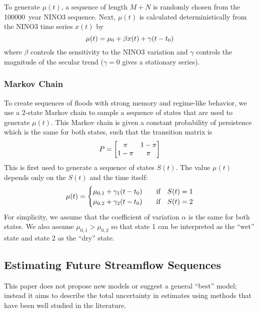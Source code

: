 \documentclass[12pt]{article}
\begin{document}
To generate $\mu(t)$, a sequence of length $M+N$ is randomly chosen from the \SI{100000}{year} NINO3 sequence.
Next, $\mu(t)$ is calculated deterministically from the NINO3 time series $x(t)$ by
\begin{equation}\label{eq:nino3}
  \mu(t) = \mu_0 + \beta x(t) + \gamma \qty(t - t_0)
\end{equation}
where $\beta$ controls the sensitivity to the NINO3 variation and $\gamma$ controls the magnitude of the secular trend ($\gamma=0$ gives a stationary series).

\subsubsection{Markov Chain\label{sec:methods-markov}}

To create sequences of floods with strong memory and regime-like behavior, we use a 2-state Markov chain to sample a sequence of states that are used to generate $\mu(t)$.
This Markov chain is given a constant probability of persistence which is the same for both states, such that the transition matrix is
\begin{equation*}
  P = \mqty[\pi & 1-\pi \\ 1-\pi & \pi]
\end{equation*}
This is first used to generate a sequence of states $S(t)$.
The value $\mu(t)$ depends only on the $S(t)$ and the time itself:
\begin{equation*}
  \mu(t) = \begin{cases}
    \mu_{0,1} + \gamma_1 \qty(t - t_0) & \qqtext{if} S(t) = 1 \\
    \mu_{0,2} + \gamma_2 \qty(t - t_0) & \qqtext{if} S(t) = 2
  \end{cases}
\end{equation*}
For simplicity, we assume that the coefficient of variation $\alpha$ is the same for both states.
We also assume $\mu_{0, 1} > \mu_{0, 2}$ so that state 1 can be interpreted as the ``wet'' state and state 2 as the ``dry'' state.

\subsection{Estimating Future Streamflow Sequences\label{sec:estimation}}

This paper does not propose new models or suggest a general ``best'' model; instead it aims to describe the total uncertainty in estimates using methods that have been well studied in the literature.
\end{document}
